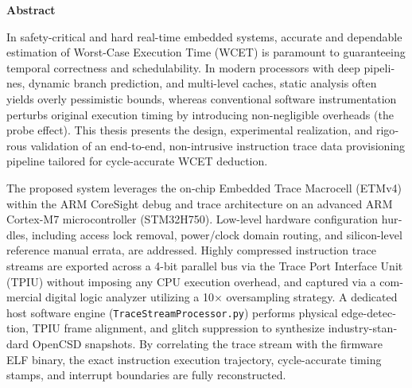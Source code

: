 
\begin{latin}
\newpage
\thispagestyle{plain}
\vspace*{-1.5cm}

\begin{center}
    {\large\bfseries Abstract}
\end{center}
\vspace{-0.2cm}

\noindent
\small
In safety-critical and hard real-time embedded systems, accurate and dependable estimation of Worst-Case Execution Time (WCET) is paramount to guaranteeing temporal correctness and schedulability. In modern processors with deep pipelines, dynamic branch prediction, and multi-level caches, static analysis often yields overly pessimistic bounds, whereas conventional software instrumentation perturbs original execution timing by introducing non-negligible overheads (the probe effect). This thesis presents the design, experimental realization, and rigorous validation of an end-to-end, non-intrusive instruction trace data provisioning pipeline tailored for cycle-accurate WCET deduction.

\medskip\noindent
The proposed system leverages the on-chip Embedded Trace Macrocell (ETMv4) within the ARM CoreSight debug and trace architecture on an advanced ARM Cortex-M7 microcontroller (STM32H750). Low-level hardware configuration hurdles, including access lock removal, power/clock domain routing, and silicon-level reference manual errata, are addressed. Highly compressed instruction trace streams are exported across a 4-bit parallel bus via the Trace Port Interface Unit (TPIU) without imposing any CPU execution overhead, and captured via a commercial digital logic analyzer utilizing a 10$\times$ oversampling strategy. A dedicated host software engine (\texttt{TraceStreamProcessor.py}) performs physical edge-detection, TPIU frame alignment, and glitch suppression to synthesize industry-standard OpenCSD snapshots. By correlating the trace stream with the firmware ELF binary, the exact instruction execution trajectory, cycle-accurate timing stamps, and interrupt boundaries are fully reconstructed.


\end{latin}
